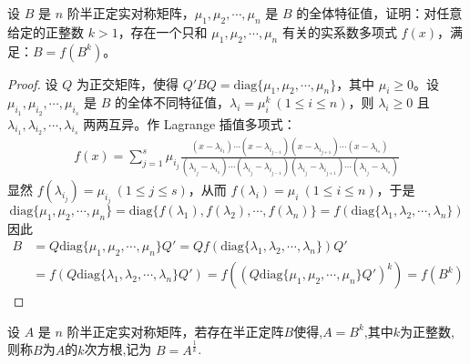 \documentclass[../../main.tex]{subfiles}%
\begin{document}
\begin{proposition}\label{proposition:例9.60}
设 \(B\) 是 \(n\) 阶半正定实对称矩阵，\(\mu_1,\mu_2,\cdots,\mu_n\) 是 \(B\) 的全体特征值，证明：对任意给定的正整数 \(k > 1\)，存在一个只和 \(\mu_1,\mu_2,\cdots,\mu_n\) 有关的实系数多项式 \(f(x)\)，满足：\(B = f(B^k)\)。
\end{proposition}
\begin{proof}
设 \(Q\) 为正交矩阵，使得 \(Q'BQ = \mathrm{diag}\{\mu_1,\mu_2,\cdots,\mu_n\}\)，其中 \(\mu_i \geqslant  0\)。设 \(\mu_{i_1},\mu_{i_2},\cdots,\mu_{i_s}\) 是 \(B\) 的全体不同特征值，\(\lambda_i = \mu_i^k\ (1\leqslant  i \leqslant  n)\)，则 \(\lambda_i \geqslant  0\) 且 \(\lambda_{i_1},\lambda_{i_2},\cdots,\lambda_{i_s}\) 两两互异。作 Lagrange 插值多项式：
\begin{align*}
f(x) = \sum_{j = 1}^{s}\mu_{i_j}\frac{(x - \lambda_{i_1})\cdots(x - \lambda_{i_{j - 1}})(x - \lambda_{i_{j + 1}})\cdots(x - \lambda_{i_s})}{(\lambda_{i_j} - \lambda_{i_1})\cdots(\lambda_{i_j} - \lambda_{i_{j - 1}})(\lambda_{i_j} - \lambda_{i_{j + 1}})\cdots(\lambda_{i_j} - \lambda_{i_s})}
\end{align*}
显然 \(f(\lambda_{i_j}) = \mu_{i_j}\ (1\leqslant  j \leqslant  s)\)，从而 \(f(\lambda_i) = \mu_i\ (1\leqslant  i \leqslant  n)\)，于是
\[
\mathrm{diag}\{\mu_1,\mu_2,\cdots,\mu_n\} = \mathrm{diag}\{f(\lambda_1),f(\lambda_2),\cdots,f(\lambda_n)\} = f(\mathrm{diag}\{\lambda_1,\lambda_2,\cdots,\lambda_n\})
\]
因此
\begin{align*}
B &= Q\mathrm{diag}\{\mu_1,\mu_2,\cdots,\mu_n\}Q' = Qf(\mathrm{diag}\{\lambda_1,\lambda_2,\cdots,\lambda_n\})Q'\\
&= f(Q\mathrm{diag}\{\lambda_1,\lambda_2,\cdots,\lambda_n\}Q') = f((Q\mathrm{diag}\{\mu_1,\mu_2,\cdots,\mu_n\}Q')^k) = f(B^k)
\end{align*} 
\end{proof}

\begin{definition}
设 \(A\) 是 \(n\) 阶半正定实对称矩阵，若存在半正定阵$B$使得,$A=B^k$,其中$k$为正整数,则称$B$为$A$的$k$次方根,记为 \(B = A^{\frac{1}{k}}\).
\end{definition}
\end{document}
